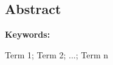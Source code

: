 \begin{otherlanguage}{english}

\chapter*{Abstract}

\lipsum[1-2]

\vspace{1cm}

\textbf{Keywords:}

Term 1; Term 2; ...; Term n
	 
\vfill


\end{otherlanguage}